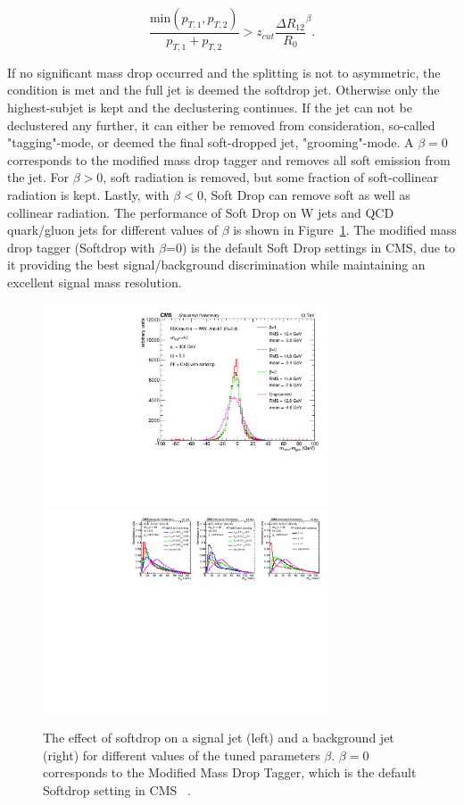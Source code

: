 \begin{equation*}
\frac{ \textrm{min}(p_{T,1},p_{T,2}) }{ p_{T,1}+p_{T,2} } > z_{cut} \frac{\Delta R_{12}}{R_0}^\beta.
\end{equation*}

If no significant mass drop occurred and the splitting is not to asymmetric, the condition is met and the full jet is deemed the softdrop jet. Otherwise only the highest-\PT subjet is kept and the declustering continues. If the jet can not be declustered any further, it can either be removed from consideration, so-called "tagging"-mode, or deemed the final soft-dropped jet, "grooming"-mode. A $\beta=0$ corresponds to the modified mass drop tagger and removes all soft emission from the jet. For $\beta>0$, soft radiation is removed, but some fraction of soft-collinear radiation is kept. Lastly, with $\beta<0$, Soft Drop can remove soft as well as collinear radiation.
The performance of Soft Drop on W jets and QCD quark/gluon jets for different values of $\beta$ is shown in Figure~\ref{fig:objreco:softdrop}. The modified mass drop tagger (Softdrop with $\beta$=0) is the default Soft Drop settings in CMS, due to it providing the best signal/background discrimination while maintaining an excellent signal mass resolution.


\begin{figure}[ht] 
    \centering 
    \includegraphics[height=6cm]{figures/event_reconstruction/sig_sd.pdf}
    \includegraphics[height=6cm]{figures/event_reconstruction/bkg_softdrop-noData.pdf}
     \caption{The effect of softdrop on a signal jet (left) and a background jet (right) for different values of the tuned parameters $\beta$. $\beta=0$ corresponds to the Modified Mass Drop Tagger, which is the default Softdrop setting in CMS ~\cite{CMS-PAS-JME-14-001}.}
     \label{fig:objreco:softdrop}
 \end{figure}

